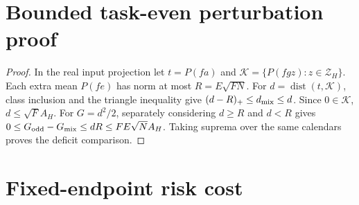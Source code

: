 \documentclass[journal]{IEEEtran}
\begin{document}
\section{Bounded task-even perturbation proof}\label{sf:even-proof}
\begin{proof}\leavevmode
In the real input projection let $t=P(fa)$ and
$\mathcal K=\{P(fgz):z\in\mathcal Z_H\}$.
Each extra mean $P(fe)$ has norm at most $R=E\sqrt{FN}$.
For $d=\operatorname{dist}(t,\mathcal K)$, class inclusion and the triangle
inequality give $(d-R)_+\le d_{\rm mix}\le d$.
Since $0\in\mathcal K$, $d\le\sqrt F A_H$.
For $G=d^2/2$, separately considering $d\ge R$ and $d<R$ gives
$0\le G_{\rm odd}-G_{\rm mix}\le dR\le FE\sqrt N A_H$.
Taking suprema over the same calendars proves the deficit comparison.
\end{proof}
\section{Fixed-endpoint risk cost}\label{sf:endpoint-proof}
\end{document}
